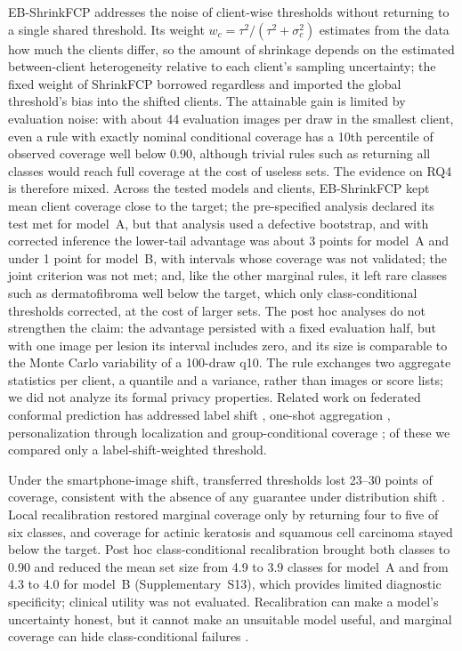 EB-ShrinkFCP addresses the noise of client-wise thresholds without returning to a single shared threshold.
Its weight $w_c=\tau^2/(\tau^2+\sigma_c^2)$ estimates from the data how much the clients differ, so the amount of shrinkage depends on the estimated between-client heterogeneity relative to each client's sampling uncertainty; the fixed weight of ShrinkFCP borrowed regardless and imported the
global threshold's bias into the shifted clients. The attainable gain is limited by evaluation noise: with
about 44 evaluation images per draw in the smallest client, even a rule with exactly nominal conditional
coverage has a 10th percentile of observed coverage well below 0.90, although trivial rules such as
returning all classes would reach full coverage at the cost of useless sets. The evidence on RQ4 is
therefore mixed. Across the tested models and clients, EB-ShrinkFCP kept mean client coverage close to the
target; the pre-specified analysis declared its test met for model~A, but that analysis used a defective bootstrap, and with corrected inference the lower-tail advantage was about 3 points for model~A and under 1 point for model~B, with intervals whose coverage was not validated; the joint criterion was not met; and, like the other marginal rules, it left rare classes such as dermatofibroma well below the
target, which only class-conditional thresholds corrected, at the cost of larger sets. The post hoc analyses do not strengthen the claim: the advantage persisted with a fixed evaluation half, but with one image per lesion its interval includes zero, and its size is comparable to the Monte Carlo variability of a 100-draw q10. The rule exchanges two
aggregate statistics per client, a quantile and a variance, rather than images or score lists; we did not
analyze its formal privacy properties. Related work on federated conformal prediction has addressed label
shift \cite{plassier2023labelshift}, one-shot aggregation \cite{humbert2023oneshot}, personalization
through localization \cite{min2025pfcp} and group-conditional coverage \cite{wen2026gcfcp}; of these we
compared only a label-shift-weighted threshold.

Under the smartphone-image shift, transferred thresholds lost 23--30 points of coverage, consistent with the
absence of any guarantee under distribution shift \cite{tibshirani2019covariate,barber2023beyond}. Local
recalibration restored marginal coverage only by returning four to five of six classes, and coverage for
actinic keratosis and squamous cell carcinoma stayed below the target. Post hoc class-conditional
recalibration brought both classes to 0.90 and reduced the mean set size from 4.9 to 3.9 classes for
model~A and from 4.3 to 4.0 for model~B (Supplementary~S13), which provides limited diagnostic specificity; clinical utility was not evaluated.
Recalibration can make a model's
uncertainty honest, but it cannot make an unsuitable model useful, and marginal coverage can hide
class-conditional failures \cite{lu2022fair}.

